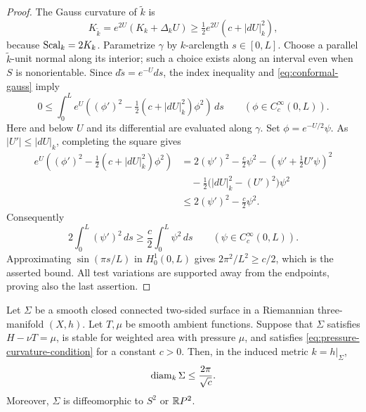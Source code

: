 \begin{proof}
The Gauss curvature of $\widetilde k$ is
\begin{equation}\label{eq:conformal-gauss}
 K_{\widetilde k}=e^{2U}(K_k+\Delta_kU)
 \ge\tfrac12 e^{2U}(c+|dU|_k^2),
\end{equation}
because $\operatorname{Scal}_k=2K_k$.  Parametrize $\gamma$ by $k$-arclength
$s\in[0,L]$.  Choose a parallel $\widetilde k$-unit normal along its
interior; such a choice exists along an interval even when $S$ is
nonorientable.  Since $d\widetilde s=e^{-U}ds$, the index inequality
and \eqref{eq:conformal-gauss} imply
\begin{equation}\label{eq:conformal-index}
 0\le\int_0^L e^U
 \left((\phi')^2-\tfrac12(c+|dU|_k^2)\phi^2\right)\,ds
 \qquad(\phi\in C_c^\infty(0,L)).
\end{equation}
Here and below $U$ and its differential are evaluated along $\gamma$.
Set $\phi=e^{-U/2}\psi$.  As $|U'|\le|dU|_k$, completing the square
gives
\begin{align*}
 e^U\left((\phi')^2-\tfrac12(c+|dU|_k^2)\phi^2\right)
 &=2(\psi')^2-\tfrac c2\psi^2
   -\left(\psi'+\tfrac12U'\psi\right)^2\\
 &\quad-\tfrac12\bigl(|dU|_k^2-(U')^2\bigr)\psi^2\\
 &\le2(\psi')^2-\tfrac c2\psi^2.
\end{align*}
Consequently
\[
 2\int_0^L(\psi')^2\,ds\ge\frac c2\int_0^L\psi^2\,ds
 \qquad(\psi\in C_c^\infty(0,L)).
\]
Approximating $\sin(\pi s/L)$ in $H_0^1(0,L)$ gives
$2\pi^2/L^2\ge c/2$, which is the asserted bound.  All test variations
are supported away from the endpoints, proving also the last assertion.
\end{proof}

\begin{proposition}\label{prop:stable-surface}
Let $\Sigma$ be a smooth closed connected two-sided surface in a
Riemannian three-manifold $(X,h)$.  Let $T,\mu$ be smooth ambient
functions.  Suppose that $\Sigma$ satisfies $H-\nu T=\mu$, is stable
for weighted area with pressure $\mu$, and satisfies
\eqref{eq:pressure-curvature-condition} for a constant $c>0$.
Then, in the induced metric $k=h|_\Sigma$,
\[
 \operatorname{diam}_k\Sigma\le\frac{2\pi}{\sqrt c}.
\]
Moreover, $\Sigma$ is diffeomorphic to $S^2$ or $\mathbb R P^2$.
\end{proposition}

